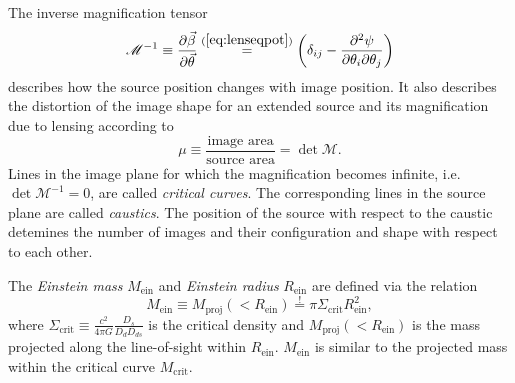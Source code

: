 The inverse magnification tensor
\begin{equation}
\mathscr{M}^{-1} \equiv \frac{\partial \vec{\beta}}{\partial \vec{\theta}} \overset{(\ref{eq:lenseqpot})}{=} \left(\delta_{ij} - \frac{\partial^2 \psi}{\partial \theta_i \partial \theta_j} \right)\label{eq:magnificationtensor}
\end{equation}
describes how the source position changes with image position. It also describes the distortion of the image shape for an extended source and its magnification due to lensing according to
$$\mu \equiv \frac{\text{image area}}{\text{source area}} = \det \mathscr{M}.$$
Lines in the image plane for which the magnification becomes infinite, i.e. $\det \mathscr{M}^{-1} = 0$, are called \emph{critical curves}. The corresponding lines in the source plane are called \emph{caustics}. The position of the source with respect to the caustic detemines the number of images and their configuration and shape with respect to each other.

The \emph{Einstein mass} $M_\text{ein}$ and \emph{Einstein radius} $R_\text{ein}$ are defined via the relation
\begin{equation*}
M_\text{ein} \equiv M_\text{proj}(<R_\text{ein}) \overset{!}{=} \pi \Sigma_\text{crit} R_\text{ein}^2,
\end{equation*}
where $\Sigma_\text{crit} \equiv \frac{c^2}{4\pi G} \frac{D_s}{D_d D_{ds}}$ is the critical density and $M_\text{proj}(<R_\text{ein})$ is the mass projected along the line-of-sight within $R_\text{ein}$. $M_\text{ein}$ is similar to the projected mass within the critical curve $M_\text{crit}$.

